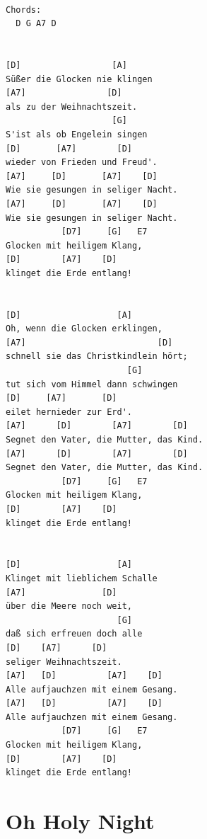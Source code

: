 \documentclass[
]{book}
\let\stdsection\section
\renewcommand\section{\clearpage\stdsection}
\begin{document}
\begin{verbatim}

Chords:
  D G A7 D 


[D]                  [A]
Süßer die Glocken nie klingen
[A7]                [D]
als zu der Weihnachtszeit.
                     [G]
S'ist als ob Engelein singen
[D]       [A7]        [D]
wieder von Frieden und Freud'.
[A7]     [D]       [A7]    [D]
Wie sie gesungen in seliger Nacht.
[A7]     [D]       [A7]    [D]
Wie sie gesungen in seliger Nacht.
           [D7]     [G]   E7
Glocken mit heiligem Klang,
[D]        [A7]    [D]
klinget die Erde entlang!

 
[D]                   [A]
Oh, wenn die Glocken erklingen,
[A7]                          [D]
schnell sie das Christkindlein hört;
                        [G]
tut sich vom Himmel dann schwingen
[D]     [A7]       [D]
eilet hernieder zur Erd'.
[A7]      [D]        [A7]        [D]
Segnet den Vater, die Mutter, das Kind.
[A7]      [D]        [A7]        [D]
Segnet den Vater, die Mutter, das Kind.
           [D7]     [G]   E7
Glocken mit heiligem Klang,
[D]        [A7]    [D]
klinget die Erde entlang!


[D]                   [A]
Klinget mit lieblichem Schalle
[A7]               [D]
über die Meere noch weit,
                      [G]
daß sich erfreuen doch alle
[D]    [A7]      [D]
seliger Weihnachtszeit.
[A7]   [D]          [A7]    [D]
Alle aufjauchzen mit einem Gesang.
[A7]   [D]          [A7]    [D]
Alle aufjauchzen mit einem Gesang.
           [D7]     [G]   E7
Glocken mit heiligem Klang,
[D]        [A7]    [D]
klinget die Erde entlang!
\end{verbatim}

\hypertarget{oh-holy-night}{%
\section{Oh Holy Night}\label{oh-holy-night}}
\end{document}
